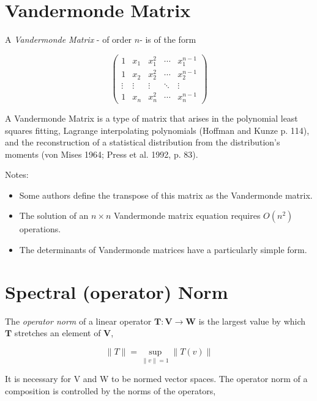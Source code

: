\documentclass[10pt]{article}
\begin{document}
\section{Vandermonde Matrix}

A {\em Vandermonde Matrix} - of order $n$- is of the form

\begin{dmath}
\left(
	\begin{array}{ccccc}
	1 &x_1 & x_1^2 & \cdots & x_1^{n-1} \\
	1& x_2 & x_2^2 & \cdots & x_2^{n-1} \\
	\vdots & \vdots & \vdots & \ddots & \vdots \\
	1& x_n & x_n^2 & \cdots & x_n^{n-1}
	\end{array} \right)
\end{dmath}

A Vandermonde Matrix is a type of matrix that arises in the polynomial least squares fitting, Lagrange interpolating polynomials (Hoffman and Kunze p. 114), and the reconstruction of a statistical distribution from the distribution's moments (von Mises 1964; Press et al. 1992, p. 83). 

\bigskip

Notes:

\begin{itemize}
	\item Some authors define the transpose of this matrix as the Vandermonde matrix.
	\item The solution of an $n \times n$ Vandermonde matrix equation requires  $O(n^2)$ operations.
	\item The determinants of Vandermonde matrices have a particularly simple form.
\end{itemize}





\section{Spectral (operator) Norm}

The {\em operator norm} of a linear operator $\mathbf{T}:\mathbf{V} \rightarrow \mathbf{W}$ is the largest value by which $\mathbf{T}$ stretches an element of $\mathbf{V}$,

\begin{dmath}
\|T\| = \sup_{\|v\|=1}\|T(v)\|
\end{dmath}

It is necessary for V and W to be normed vector spaces. The operator norm of a composition is controlled by the norms of the operators,
\end{document}
